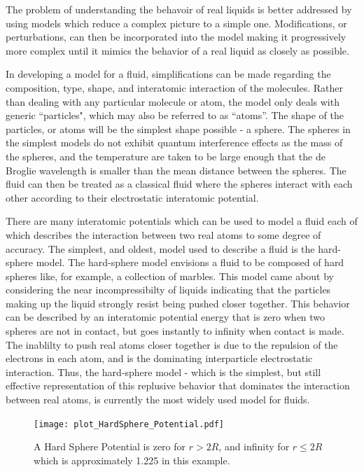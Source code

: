\documentclass[double,12pt]{beavtex}
\begin{document}
The problem of understanding the behavoir of real liquids is better addressed 
by using models which reduce a complex picture to a simple one. Modifications, 
or perturbations, can then be incorporated into the model making it 
progressively more complex until it mimics the behavior of a real 
liquid as closely as possible.

In developing a model for a fluid, simplifications can be made regarding 
the composition, type, shape, and interatomic interaction of the molecules. 
Rather than dealing with any particular molecule or atom, the model only 
deals with generic ``particles", which may also be referred to as ``atoms''. 
The shape of the particles, or atoms will be the simplest shape possible - 
a sphere. The spheres in the simplest models do not exhibit quantum 
interference effects as the mass of the spheres, and the temperature 
are taken to be large enough that the de Broglie wavelength is smaller 
than the mean distance between the spheres. The fluid can then be treated 
as a classical fluid where the spheres interact with each other according 
to their electrostatic interatomic potential. 

There are many interatomic potentials which can be used to model a fluid 
each of which describes the interaction between two real atoms to some 
degree of accuracy. The simplest, and oldest, model used to describe a 
fluid is the hard-sphere model. The hard-sphere model envisions a fluid 
to be composed of hard spheres like, for example, a collection of marbles. 
This model came about by considering the near incompressibilty of liquids 
indicating that the particles making up the liquid strongly resist being 
pushed closer together. This behavior can be described by an interatomic 
potential energy that is zero when two spheres are not in contact, but 
goes instantly to infinity when contact is made. The inablilty to push 
real atoms closer together is due to the repulsion of the electrons in 
each atom, and is the dominating interparticle electrostatic interaction. 
Thus, the hard-sphere model - which is the simplest, but still effective 
representation of this replusive behavior that dominates the interaction 
between real atoms, is currently the most widely used model for fluids.

\begin{figure}[h!]
    \centering
    \texttt{[image: plot\_HardSphere\_Potential.pdf]}
    \caption{A Hard Sphere Potential is zero for $r>2R$, and infinity 
    for $r\leq{2R}$ which is approximately 1.225 in this example.}
    \label{fig:HardSphere_potential}
  \end{figure}
\end{document}
